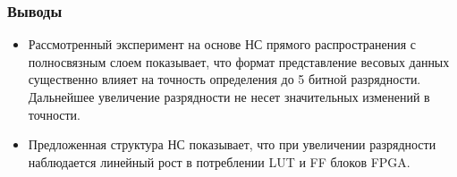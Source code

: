 \begin{frame}[t]
\frametitle{Выводы}
\begin{itemize}
    \item Рассмотренный эксперимент на основе НС прямого распространения с
    полносвязным слоем показывает, что формат представление 
    весовых данных существенно влияет на точность определения 
    до 5 битной разрядности. Дальнейшее увеличение разрядности 
    не несет значительных изменений в точности.
    \item Предложенная структура НС показывает, что при увеличении
    разрядности наблюдается линейный рост в потреблении LUT и FF блоков FPGA.
\end{itemize}
\end{frame}

